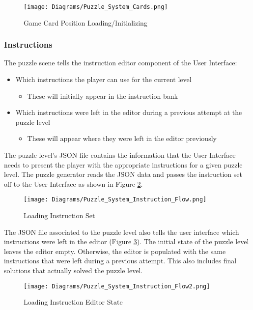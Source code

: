 \begin{figure}[!hb]
  \caption{Game Card Position Loading/Initializing}
  \label{fig:Puzzle_System_Cards}
  \centering
  \texttt{[image: Diagrams/Puzzle\_System\_Cards.png]}
\end{figure}
\newpage

\subsubsection{Instructions}
The puzzle scene tells the instruction editor component of the User Interface:
\begin{itemize}
  \item Which instructions the player can use for the current level
  \begin{itemize}
    \item These will initially appear in the instruction bank
  \end{itemize}
  \item Which instructions were left in the editor during a previous attempt at
  the puzzle level
  \begin{itemize}
    \item These will appear where they were left in the editor previously
  \end{itemize}
\end{itemize}

The puzzle level's JSON file contains the information that the User Interface
needs to present the player with the appropriate instructions for a given puzzle level.
The puzzle generator reads the JSON data and passes the instruction set off to the User Interface
as shown in Figure \ref{fig:Instruction_Flow}.

\begin{figure}[!hb]
  \caption{Loading Instruction Set}
  \label{fig:Instruction_Flow}
  \centering
  \texttt{[image: Diagrams/Puzzle\_System\_Instruction\_Flow.png]}
\end{figure}

The JSON file associated to the puzzle level also tells the user interface which
instructions were left in the editor (Figure \ref{fig:Instruction_Flow2}). The initial state of the puzzle level leaves the
editor empty. Otherwise, the editor is populated with the same instructions that were
left during a previous attempt. This also includes final solutions that actually solved the
puzzle level.

\begin{figure}[!hb]
  \caption{Loading Instruction Editor State}
  \label{fig:Instruction_Flow2}
  \centering
  \texttt{[image: Diagrams/Puzzle\_System\_Instruction\_Flow2.png]}
\end{figure}
